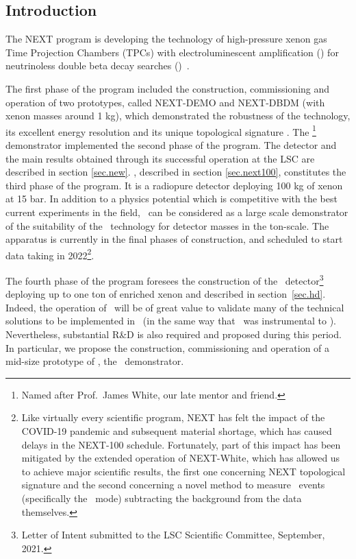 \subsection{Introduction}

The NEXT program is developing the technology of high-pressure xenon gas Time Projection Chambers (TPCs) with electroluminescent amplification (\HPXeEL) for neutrinoless double beta decay searches (\bbonu)~\cite{Gomez-Cadenas:2019sfa}. 

\indent

The first phase of the program included the construction, commissioning and operation of two prototypes, called NEXT-DEMO and NEXT-DBDM (with xenon masses around 1 kg), which demonstrated the robustness of the technology, its excellent energy resolution and its unique topological signature \cite{Alvarez:2012xda, Alvarez:2013gxa, Alvarez:2012hh, Ferrario:2015kta}. The \NEW\footnote{Named after Prof.~James White, our late mentor and friend.} demonstrator implemented the second phase of the program. The detector and the main results obtained through its successful operation at the LSC are described in section \ref{sec.new}. \Next, described in section \ref{sec.next100}, constitutes the third phase of the program. It is a radiopure detector deploying 100 kg of xenon at 15 bar. In addition to a physics potential which is competitive with the best current experiments in the field, \Next\ can be considered as a large scale demonstrator of the suitability of the \HPXeEL\ technology for detector masses in the ton-scale. The apparatus is currently in the final phases of construction, and scheduled to start data taking in 2022\footnote{
Like virtually every scientific program, NEXT has felt the impact of the COVID-19 pandemic and subsequent material shortage, which has caused delays in the NEXT-100 schedule. Fortunately, part of this impact has been mitigated by the extended operation of NEXT-White, which has allowed us to achieve major scientific results, the first one concerning NEXT topological signature and the second concerning a novel method to measure \bb\ events
(specifically the \bbtnu\ mode) subtracting the background from the data themselves.}. 

\indent

The fourth phase of the program foresees the construction of the \NHD\ detector\footnote{Letter of Intent submitted to the LSC Scientific Committee, September,  2021.} deploying up to one ton of enriched xenon and described in section~\ref{sec.hd}. Indeed, the operation of \Next\ will be of great value to validate many of the technical solutions to be implemented in \NHD\ (in the same way that \NEW\ was instrumental to \Next). Nevertheless, substantial R\&D is also required and proposed during this period. In particular, we propose the construction, commissioning and operation of a mid-size prototype of \NHD, the \HDEMO\ demonstrator. 

